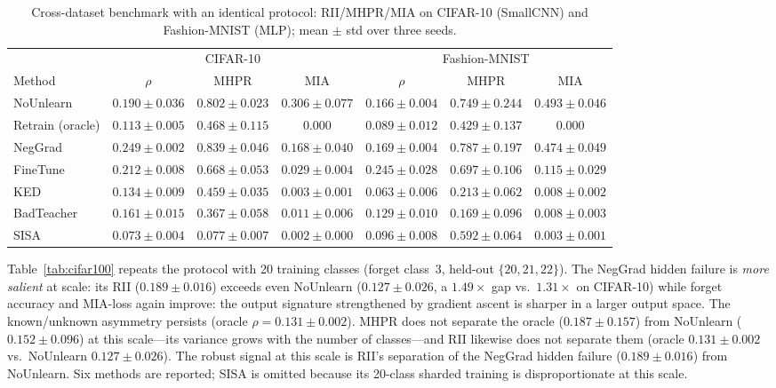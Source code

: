 \documentclass[smallextended]{svjour3}       %
\begin{document}
\begin{table}[t]
\centering
\small
\caption{Cross-dataset benchmark with an identical protocol: RII/MHPR/MIA on CIFAR-10 (SmallCNN) and Fashion-MNIST (MLP); mean $\pm$ std over three seeds.}\label{tab:cross}
\setlength{\tabcolsep}{0pt}
\footnotesize
\begin{tabular}{l c c c | c c c}
\toprule
 & \multicolumn{3}{c|}{CIFAR-10} & \multicolumn{3}{c}{Fashion-MNIST} \\
Method & $\rho$ & MHPR & MIA & $\rho$ & MHPR & MIA \\
\midrule
NoUnlearn & $0.190{\pm}0.036$ & $0.802{\pm}0.023$ & $0.306{\pm}0.077$ & $0.166{\pm}0.004$ & $0.749{\pm}0.244$ & $0.493{\pm}0.046$ \\
Retrain (oracle) & $0.113{\pm}0.005$ & $0.468{\pm}0.115$ & 0.000 & $0.089{\pm}0.012$ & $0.429{\pm}0.137$ & 0.000 \\
NegGrad & $\mathbf{0.249{\pm}0.002}$ & $0.839{\pm}0.046$ & $0.168{\pm}0.040$ & $0.169{\pm}0.004$ & $0.787{\pm}0.197$ & $0.474{\pm}0.049$ \\
FineTune & $0.212{\pm}0.008$ & $0.668{\pm}0.053$ & $0.029{\pm}0.004$ & $0.245{\pm}0.028$ & $0.697{\pm}0.106$ & $0.115{\pm}0.029$ \\
KED & $0.134{\pm}0.009$ & $0.459{\pm}0.035$ & $0.003{\pm}0.001$ & $\mathbf{0.063{\pm}0.006}$ & $0.213{\pm}0.062$ & $0.008{\pm}0.002$ \\
BadTeacher & $0.161{\pm}0.015$ & $0.367{\pm}0.058$ & $0.011{\pm}0.006$ & $0.129{\pm}0.010$ & $0.169{\pm}0.096$ & $0.008{\pm}0.003$ \\
SISA & $0.073{\pm}0.004$ & $0.077{\pm}0.007$ & $0.002{\pm}0.000$ & $0.096{\pm}0.008$ & $0.592{\pm}0.064$ & $0.003{\pm}0.001$ \\
\bottomrule
\end{tabular}
\end{table}

Table~\ref{tab:cifar100} repeats the protocol with 20 training classes (forget class~3, held-out $\{20,21,22\}$). The NegGrad hidden failure is \emph{more salient} at scale: its RII ($0.189{\pm}0.016$) exceeds even NoUnlearn ($0.127{\pm}0.026$, a $1.49\times$ gap vs.\ $1.31\times$ on CIFAR-10) while forget accuracy and MIA-loss again improve: the output signature strengthened by gradient ascent is sharper in a larger output space. The known/unknown asymmetry persists (oracle $\rho{=}0.131{\pm}0.002$). MHPR does not separate the oracle ($0.187{\pm}0.157$) from NoUnlearn ($0.152{\pm}0.096$) at this scale---its variance grows with the number of classes---and RII likewise does not separate them (oracle $0.131{\pm}0.002$ vs.\ NoUnlearn $0.127{\pm}0.026$). The robust signal at this scale is RII's separation of the NegGrad hidden failure ($0.189{\pm}0.016$) from NoUnlearn. Six methods are reported; SISA is omitted because its 20-class sharded training is disproportionate at this scale.
\end{document}
